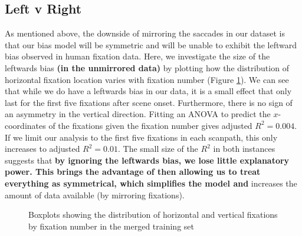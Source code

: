 \documentclass[a4paper, twocolumn, oneside, 11pt]{article}
\begin{document}
\subsection{Left v Right}
\label{sec:LeftRight}

As mentioned above, the downside of mirroring the saccades in our dataset is that our bias model will be symmetric and will be unable to exhibit the leftward bias observed in human fixation data. Here, we investigate the size of the leftwards bias \textbf{(in the unmirrored data)} by plotting how the distribution of horizontal fixation location varies with fixation number (Figure \ref{fig:leftrightDist}). We can see that while we do have a leftwards bias in our data, it is a small effect that only last for the first five fixations after scene onset. Furthermore, there is no sign of an asymmetry in the vertical direction. Fitting an ANOVA to predict the $x$-coordinates of the fixations given the fixation number gives adjusted $R^2=0.004$. If we limit our analysis to the first five fixations in each scanpath, this only increases to adjusted $R^2=0.01$. The small size of the $R^2$ in both instances suggests that \textbf{by ignoring the leftwards bias, we lose little explanatory power. This brings the advantage of then allowing us to treat everything as symmetrical, which simplifies the model and} increases the amount of data available (by mirroring fixations). 

\begin{figure}
\centering
{}
\caption{Boxplots showing the distribution of horizontal and vertical fixations by fixation number in the merged training set}
\label{fig:leftrightDist}
\end{figure}
\end{document}
